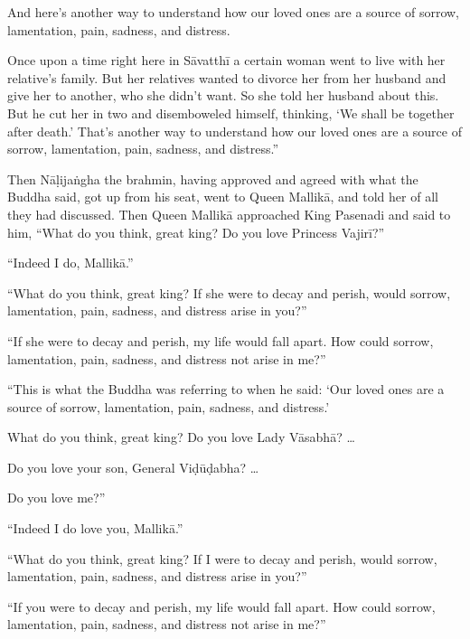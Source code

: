 \documentclass[12pt,openany]{book}%
\begin{document}
And here’s another way to understand how our loved ones are a source of sorrow, lamentation, pain, sadness, and distress. 

Once upon a time right here in \textsanskrit{Sāvatthī} a certain woman went to live with her relative’s family. But her relatives wanted to divorce her from her husband and give her to another, who she didn’t want. So she told her husband about this. But he cut her in two and disemboweled himself, thinking, ‘We shall be together after death.’ That’s another way to understand how our loved ones are a source of sorrow, lamentation, pain, sadness, and distress.” 

Then \textsanskrit{Nāḷijaṅgha} the brahmin, having approved and agreed with what the Buddha said, got up from his seat, went to Queen \textsanskrit{Mallikā}, and told her of all they had discussed. Then Queen \textsanskrit{Mallikā} approached King Pasenadi and said to him, “What do you think, great king? Do you love Princess \textsanskrit{Vajirī}?” 

“Indeed I do, \textsanskrit{Mallikā}.” 

“What do you think, great king? If she were to decay and perish, would sorrow, lamentation, pain, sadness, and distress arise in you?” 

“If she were to decay and perish, my life would fall apart. How could sorrow, lamentation, pain, sadness, and distress not arise in me?” 

“This is what the Buddha was referring to when he said: ‘Our loved ones are a source of sorrow, lamentation, pain, sadness, and distress.’ 

What do you think, great king? Do you love Lady \textsanskrit{Vāsabhā}? … 

Do you love your son, General \textsanskrit{Viḍūḍabha}? … 

Do you love me?” 

“Indeed I do love you, \textsanskrit{Mallikā}.” 

“What do you think, great king? If I were to decay and perish, would sorrow, lamentation, pain, sadness, and distress arise in you?” 

“If you were to decay and perish, my life would fall apart. How could sorrow, lamentation, pain, sadness, and distress not arise in me?” 
\end{document}

